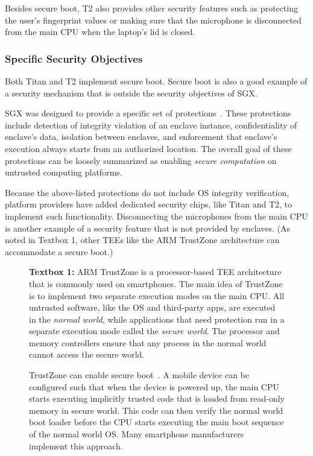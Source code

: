 \documentclass[letterpaper,twocolumn,10pt]{article}
\begin{document}
Besides secure boot, T2 also provides other security features such as protecting the user's fingerprint values or making sure that the microphone is disconnected from the main CPU when the laptop's lid is closed. 
 
 
\subsubsection*{Specific Security Objectives}

  Both Titan and T2 implement secure boot. Secure boot is also a good example of a security mechanism that is outside the security objectives of SGX.

SGX was designed to provide a specific set of protections~\cite{mckeen2013}. These protections include detection of integrity violation of an enclave instance, confidentiality of enclave's data, isolation between enclaves, and enforcement that enclave's execution always starts from an authorized location. The overall  goal of these protections can be loosely summarized as enabling \emph{secure computation} on untrusted computing platforms. 

Because the above-listed protections do not include OS integrity verification, platform providers have added dedicated security chips, like Titan and T2, to implement such functionality. Disconnecting the microphones from the main CPU is another example of a security feature that is not provided by enclaves. (As noted in Textbox 1, other TEEs like the ARM TrustZone architecture can accommodate a secure boot.) 


\begin{figure}
    \begin{tcolorbox}
    \textbf{Textbox 1:} 
    ARM TrustZone is a processor-based TEE architecture that is commonly used on smartphones. The main idea of TrustZone is to implement two separate execution modes on the main CPU. All untrusted software, like the OS and third-party apps, are executed in the \emph{normal world}, while applications that need protection run in a separate execution mode called the \emph{secure world}. The processor and memory controllers ensure that any process in the normal world cannot access the secure world.
    
    \hspace{10pt} TrustZone can enable secure boot~\cite{ekberg2014untapped}. A mobile device can be configured such that when the device is powered up, the main CPU starts executing implicitly trusted code that is loaded from read-only memory in secure world. This code can then verify the normal world boot loader before the CPU starts executing the main boot sequence of the normal world OS. Many smartphone manufacturers implement this approach.
    \end{tcolorbox}
\end{figure}  
\end{document}
